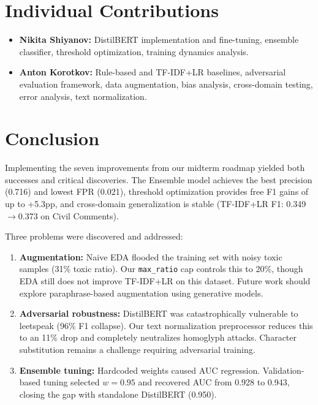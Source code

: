 \documentclass[11pt,a4paper]{article}
\begin{document}
\section{Individual Contributions}

\begin{itemize}[nosep]
  \item \textbf{Nikita Shiyanov:} DistilBERT implementation and fine-tuning, ensemble classifier, threshold optimization, training dynamics analysis.
  \item \textbf{Anton Korotkov:} Rule-based and TF-IDF+LR baselines, adversarial evaluation framework, data augmentation, bias analysis, cross-domain testing, error analysis, text normalization.
\end{itemize}

\section{Conclusion}

Implementing the seven improvements from our midterm roadmap yielded both successes and critical discoveries.
The Ensemble model achieves the best precision (0.716) and lowest FPR (0.021), threshold optimization provides free F1 gains of up to +5.3pp, and cross-domain generalization is stable (TF-IDF+LR F1: 0.349$\to$0.373 on Civil Comments).

Three problems were discovered and addressed:
\begin{enumerate}[nosep]
  \item \textbf{Augmentation:} Naive EDA flooded the training set with noisy toxic samples (31\% toxic ratio). Our \texttt{max\_ratio} cap controls this to 20\%, though EDA still does not improve TF-IDF+LR on this dataset. Future work should explore paraphrase-based augmentation using generative models.
  \item \textbf{Adversarial robustness:} DistilBERT was catastrophically vulnerable to leetspeak (96\% F1 collapse). Our text normalization preprocessor reduces this to an 11\% drop and completely neutralizes homoglyph attacks. Character substitution remains a challenge requiring adversarial training.
  \item \textbf{Ensemble tuning:} Hardcoded weights caused AUC regression. Validation-based tuning selected $w=0.95$ and recovered AUC from 0.928 to 0.943, closing the gap with standalone DistilBERT (0.950).
\end{enumerate}
\end{document}
